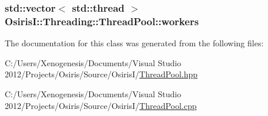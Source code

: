 \hypertarget{class_osiris_i_1_1_threading_1_1_thread_pool_ac02477cecf8598aa185978899b6b86aa}{
\subsubsection[{workers}]{\setlength{\rightskip}{0pt plus 5cm}std\-::vector$<$ std\-::thread $>$ Osiris\-I\-::\-Threading\-::\-Thread\-Pool\-::workers\hspace{0.3cm}{\ttfamily [protected]}}}\label{class_osiris_i_1_1_threading_1_1_thread_pool_ac02477cecf8598aa185978899b6b86aa}


The documentation for this class was generated from the following files\-:\begin{DoxyCompactItemize}
\item 
C\-:/\-Users/\-Xenogenesis/\-Documents/\-Visual Studio 2012/\-Projects/\-Osiris/\-Source/\-Osiris\-I/\hyperlink{_thread_pool_8hpp}{Thread\-Pool.\-hpp}\item 
C\-:/\-Users/\-Xenogenesis/\-Documents/\-Visual Studio 2012/\-Projects/\-Osiris/\-Source/\-Osiris\-I/\hyperlink{_thread_pool_8cpp}{Thread\-Pool.\-cpp}\end{DoxyCompactItemize}
